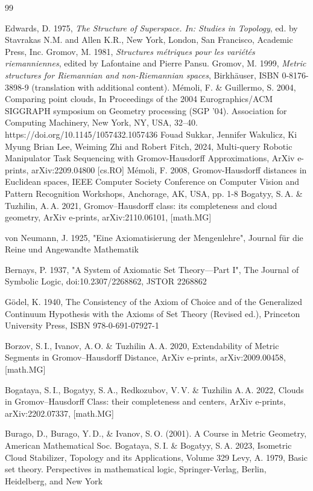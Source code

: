 \documentclass[11pt,twoside,draft
]{article}
\begin{document}
\begin{engbibliography}{99}

   Edwards, D. 1975, \emph{The Structure of
  Superspace. In: Studies in Topology}, ed. by Stavrakas N.M. and
  Allen K.R., New York, London, San Francisco, Academic Press, Inc.
   Gromov, M. 1981, \emph{Structures m\'etriques
  pour les vari\'et\'es riemanniennes}, edited by Lafontaine and Pierre Pansu.
   Gromov, M. 1999, \emph{Metric structures for
  Riemannian and non-Riemannian spaces}, Birkh\"auser, ISBN
  0-8176-3898-9 (translation with additional content).
  Mémoli, F. \& Guillermo, S. 2004, Comparing point clouds, In
  Proceedings of the 2004 Eurographics/ACM SIGGRAPH symposium on
  Geometry processing (SGP '04). Association for Computing Machinery,
  New York, NY, USA, 32–40. https://doi.org/10.1145/1057432.1057436
   Fouad Sukkar, Jennifer Wakulicz, Ki Myung
  Brian Lee, Weiming Zhi and Robert Fitch, 2024, Multi-query Robotic
  Manipulator Task Sequencing with Gromov-Hausdorff Approximations,
  ArXiv e-prints,
  arXiv:2209.04800 [cs.RO]
  Mémoli, F. 2008, Gromov-Hausdorff distances in Euclidean spaces,
  IEEE Computer Society Conference on Computer Vision and Pattern
  Recognition Workshops, Anchorage, AK, USA, pp. 1-8
  Bogatyy, S.\,A. \& Tuzhilin, A.\,A. 2021, Gromov–Hausdorff class:
  its completeness and cloud geometry, ArXiv e-prints,
  arXiv:2110.06101, [math.MG]

  von Neumann, J. 1925, "Eine Axiomatisierung der Mengenlehre",
  Journal für die Reine und Angewandte Mathematik

  Bernays, P. 1937, "A System of Axiomatic Set Theory—Part I", The
  Journal of Symbolic Logic, doi:10.2307/2268862, JSTOR 2268862

  Gödel, K. 1940, The Consistency of the Axiom of Choice and of the
  Generalized Continuum Hypothesis with the Axioms of Set Theory
  (Revised ed.), Princeton University Press,  ISBN 978-0-691-07927-1

  Borzov, S.\,I., Ivanov, A.\,O. \& Tuzhilin A.\,A. 2020,
  Extendability of Metric Segments in
  Gromov–Hausdorff Distance, ArXiv e-prints,
  arXiv:2009.00458, [math.MG]

  Bogataya, S.\,I., Bogatyy, S.\,A., Redkozubov, V.\,V. \& Tuzhilin
  A.\,A. 2022, Clouds in Gromov–Hausdorff Class: their
  completeness and centers, ArXiv e-prints,
  arXiv:2202.07337, [math.MG]

  Burago, D., Burago, Y.\,D., \& Ivanov, S.\,O. (2001). A Course in
  Metric Geometry, American Mathematical Soc.
  Bogataya, S.\,I. \& Bogatyy, S.\,A. 2023, Isometric Cloud
  Stabilizer, Topology and its Applications,
  Volume 329
  Levy, A. 1979, Basic set theory. Perspectives in
  mathematical logic, Springer-Verlag, Berlin, Heidelberg, and New York

\end{engbibliography}

\label{end}
\end{document}
